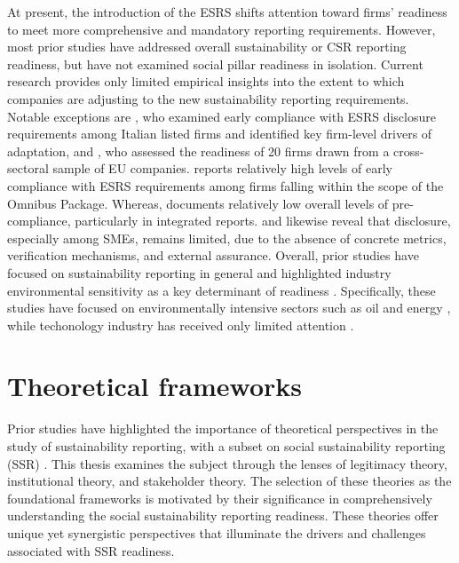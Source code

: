 At present, the introduction of the ESRS shifts attention toward firms' readiness to 
meet more comprehensive and mandatory reporting requirements. However, most prior studies 
have addressed overall sustainability or CSR reporting readiness,
but have not examined social pillar readiness in isolation. Current research provides only 
limited empirical insights into the extent to which companies are adjusting to the new 
sustainability reporting requirements. Notable exceptions are \textcite{Nicolo2025}, who examined early compliance with 
ESRS disclosure requirements among Italian listed firms and identified key firm-level drivers of 
adaptation, and \textcite{Filho2025}, who assessed the readiness of 20 firms drawn from a cross-sectoral 
sample of EU companies. \textcite{Nicolo2025} reports relatively high levels of early compliance 
with ESRS requirements among firms falling within the scope of the Omnibus Package. Whereas, 
\textcite{Raimo2025} documents relatively low overall levels of pre-compliance, 
particularly in integrated reports. \textcite{Filho2025} and \textcite{Montero2025} likewise reveal 
that disclosure, especially among SMEs, remains limited, due to the absence of concrete metrics, 
verification mechanisms, and external assurance. Overall, prior studies have focused on 
sustainability reporting in general and highlighted industry environmental sensitivity 
as a key determinant of readiness \parencite{Filho2025, Raimo2025, Nicolo2025, Montero2025}.
Specifically, these studies have focused on environmentally intensive sectors such as oil and 
energy \parencite{Filho2025, Raimo2025, Nicolo2025}, while techonology industry has received 
only limited attention \parencite{Montero2025}.

\section{Theoretical frameworks}

Prior studies have highlighted the importance of theoretical perspectives in the study of sustainability 
reporting, with a subset on social sustainability reporting (SSR) \parencite{Gesso2023, Rezaee2016, Lozano2015}.
This thesis examines the subject through the lenses of  legitimacy theory, institutional theory, 
and stakeholder theory. The selection of these theories as the foundational frameworks is motivated 
by their significance in comprehensively understanding the social
sustainability reporting readiness. These theories offer unique yet synergistic perspectives that
illuminate the drivers and challenges associated with SSR readiness.


